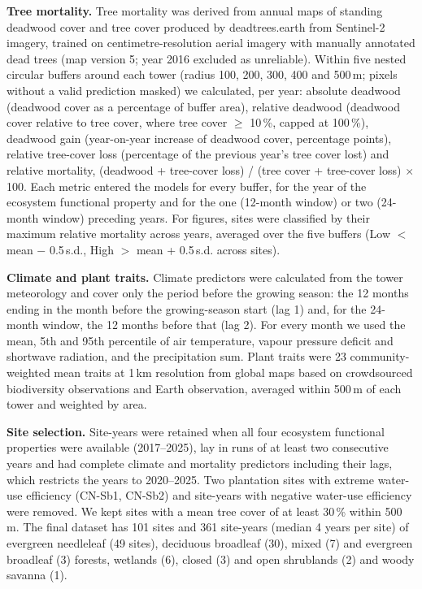 \documentclass[11pt,a4paper]{article}
\begin{document}
\textbf{Tree mortality.} Tree mortality was derived from annual maps of standing deadwood cover and tree cover produced by
deadtrees.earth from Sentinel-2 imagery, trained on centimetre-resolution aerial imagery with manually annotated dead
trees\cite{mosig2025deadtrees} (map version 5; year 2016 excluded as unreliable). Within five nested circular buffers around each
tower (radius 100, 200, 300, 400 and 500\,m; pixels without a valid prediction masked) we calculated, per year: absolute
deadwood (deadwood cover as a percentage of buffer area), relative deadwood (deadwood cover relative to tree cover, where tree
cover $\geq$ 10\,\%, capped at 100\,\%), deadwood gain (year-on-year increase of deadwood cover, percentage points), relative
tree-cover loss (percentage of the previous year's tree cover lost) and relative mortality, (deadwood + tree-cover loss) / (tree
cover + tree-cover loss) $\times$ 100. Each metric entered the models for every buffer, for the year of the ecosystem functional
property and for the one (12-month window) or two (24-month window) preceding years. For figures, sites were classified by
their maximum relative mortality across years, averaged over the five buffers (Low $<$ mean $-$ 0.5\,s.d., High $>$ mean + 0.5\,s.d.
across sites).

\textbf{Climate and plant traits.} Climate predictors were calculated from the tower meteorology and cover only the period
before the growing season: the 12 months ending in the month before the growing-season start (lag 1) and, for the 24-month window,
the 12 months before that (lag 2). For every month we used the mean, 5th and 95th percentile of air temperature, vapour pressure
deficit and shortwave radiation, and the precipitation sum. Plant traits were 23 community-weighted mean traits at 1\,km
resolution from global maps based on crowdsourced biodiversity observations and Earth observation\cite{lusk2026crowdsourced},
averaged within 500\,m of each tower and weighted by area.

\textbf{Site selection.} Site-years were retained when all four ecosystem functional properties were available (2017--2025),
lay in runs of at least two consecutive years and had complete climate and mortality predictors including their lags, which
restricts the years to 2020--2025. Two plantation sites with extreme water-use efficiency (CN-Sb1, CN-Sb2) and site-years with
negative water-use efficiency were removed. We kept sites with a mean tree cover of at least 30\,\% within 500\,m. The final
dataset has 101 sites and 361 site-years (median 4 years per site) of evergreen needleleaf (49 sites), deciduous broadleaf (30),
mixed (7) and evergreen broadleaf (3) forests, wetlands (6), closed (3) and open shrublands (2) and woody savanna (1).
\end{document}
